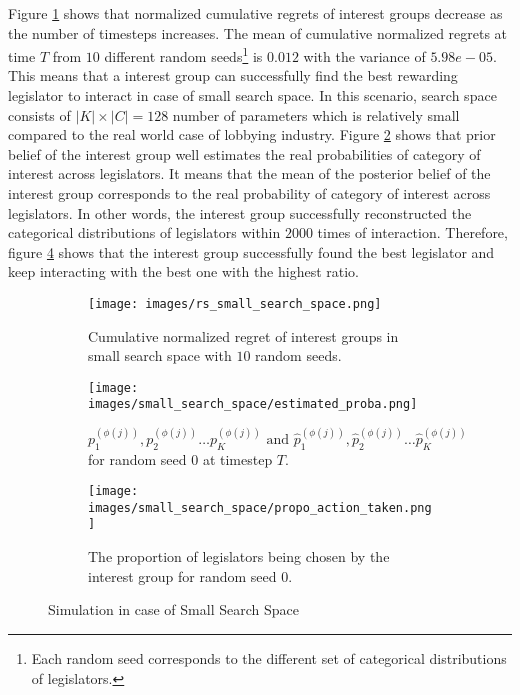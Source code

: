 \documentclass{article}
\begin{document}
Figure \ref{fig:rs_small} shows that 
normalized cumulative regrets of interest groups 
decrease as the number of timesteps increases.
The mean of cumulative normalized regrets at time $T$ from 
$10$ different random seeds\footnote{Each random seed  
corresponds to the different set of categorical distributions of legislators. 
} is $0.012$ with 
the variance of $5.98e-05$. 
This means that 
a interest group can successfully find the 
best rewarding legislator to interact in case of small search space.
In this scenario, search space consists of 
$|K| \times |C| = 128$ number of parameters 
which is relatively small compared to the real world case of 
lobbying industry.
Figure \ref{fig:smallproba} shows that 
prior belief of the interest group well 
estimates the real probabilities of category of interest across legislators. 
It means that the mean of the posterior belief of the interest group corresponds to the real probability of category of interest across legislators.
In other words, the interest group successfully
reconstructed the categorical distributions of legislators within $2000$ times of interaction.
Therefore, figure \ref{fig:smallpropo} shows that the interest group 
successfully found the best legislator and keep interacting 
with the best one with the highest ratio.

\begin{figure}[h!]  
    \centering %
    \begin{subfigure}[b]{0.45\textwidth}
        \texttt{[image: images/rs\_small\_search\_space.png]}
        \caption{Cumulative normalized regret of interest groups in small search space with $10$ random seeds.}
        \label{fig:rs_small}
    \end{subfigure}
    \begin{subfigure}[b]{0.5\textwidth}
        \texttt{[image: images/small\_search\_space/estimated\_proba.png]}
        \caption{$p_1^{(\phi(j))}, p_2^{(\phi(j))} \hdots p_K^{(\phi(j))} \text{ and } \hat{p}_1^{(\phi(j))}, \hat{p}_2^{(\phi(j))} \hdots \hat{p}_K^{(\phi(j))}$ for random seed $0$ at timestep $T$.}
        \label{fig:smallproba}
    \end{subfigure}

    \begin{subfigure}[b]{1\columnwidth}
        \centering
        \texttt{[image: images/small\_search\_space/propo\_action\_taken.png]}
        \caption{The proportion of legislators being chosen by the interest group for random seed $0$.}
        \label{fig:smallpropo}
    \end{subfigure}
    \caption{Simulation in case of Small Search Space}
\end{figure}
    
\end{document}

